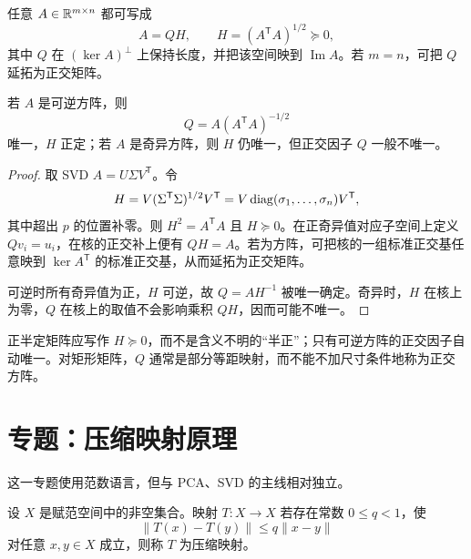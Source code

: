 \begin{theorem}[极分解]
任意 $A\in\mathbb{R}^{m\times n}$ 都可写成
\[
A=QH,
\qquad
H=(A^{\mathsf T}A)^{1/2}\succeq0,
\]
其中 $Q$ 在 $(\ker A)^\perp$ 上保持长度，并把该空间映到 $\operatorname{Im}A$。若 $m=n$，可把 $Q$ 延拓为正交矩阵。

若 $A$ 是可逆方阵，则
\[
Q=A(A^{\mathsf T}A)^{-1/2}
\]
唯一，$H$ 正定；若 $A$ 是奇异方阵，则 $H$ 仍唯一，但正交因子 $Q$ 一般不唯一。
\end{theorem}
\begin{proof}
取 SVD $A=U\Sigma V^{\mathsf T}$。令
\[
H=V(\Sigma^{\mathsf T}\Sigma)^{1/2}V^{\mathsf T}
=V\operatorname{diag}(\sigma_1,\ldots,\sigma_n)V^{\mathsf T},
\]
其中超出 $p$ 的位置补零。则 $H^2=A^{\mathsf T}A$ 且 $H\succeq0$。在正奇异值对应子空间上定义 $Qv_i=u_i$，在核的正交补上便有 $QH=A$。若为方阵，可把核的一组标准正交基任意映到 $\ker A^{\mathsf T}$ 的标准正交基，从而延拓为正交矩阵。

可逆时所有奇异值为正，$H$ 可逆，故 $Q=AH^{-1}$ 被唯一确定。奇异时，$H$ 在核上为零，$Q$ 在核上的取值不会影响乘积 $QH$，因而可能不唯一。
\end{proof}

\begin{pitfall}[极分解中的两个常见错误]
正半定矩阵应写作 $H\succeq0$，而不是含义不明的“半正”；只有可逆方阵的正交因子自动唯一。对矩形矩阵，$Q$ 通常是部分等距映射，而不能不加尺寸条件地称为正交方阵。
\end{pitfall}

\section{专题：压缩映射原理}

这一专题使用范数语言，但与 PCA、SVD 的主线相对独立。

\begin{definition}[压缩映射]
设 $X$ 是赋范空间中的非空集合。映射 $T:X\to X$ 若存在常数 $0\le q<1$，使
\[
\lVert T(x)-T(y)\rVert\le q\lVert x-y\rVert
\]
对任意 $x,y\in X$ 成立，则称 $T$ 为压缩映射。
\end{definition}


